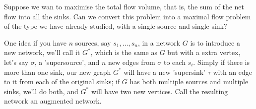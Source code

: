 \documentclass[10pt, a4paper]{article}
\begin{document}
Suppose we wan to maximise the total flow volume,
that is,
the sum of the net flow into all the sinks.
Can we convert this problem into a maximal flow problem of the type we have already studied,
with a single source and single sink?

One idea if you have $n$ sources,
say $s_1, \dotsc, s_n$,
in a network $G$ is to introduce a new network,
we'll call it $G ^ {*}$,
which is the same as $G$ but with a extra vertex,
let's say $\sigma$,
a 'supersource',
and $n$ new edges from $\sigma$ to each $s_i$.
Simply if there is more than one sink,
our new graph $G ^ {*}$ will have a new 'supersink' $\tau$ with an edge to it from each of the original sinks;
if $G$ has both multiple sources and multiple sinks,
we'll do both,
and $G ^ {*}$ will have two new vertices.
Call the resulting network an augmented network.
\end{document}
